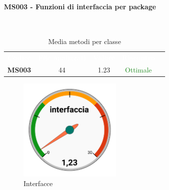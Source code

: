 \paragraph{MS003 - Funzioni di interfaccia per package}\mbox{}\\[0,3cm]
    \begin{table}[H]
        \centering
        \begin{tabular}{ccccc}
            \rowcolor{greySWEight}
            \textcolor{white}{\textbf{Codice}} &
            \textcolor{white}{\textbf{File analizzati}} &
            \textcolor{white}{\textbf{Valore}}&
            \textcolor{white}{\textbf{Riscontro}}\\
            \textbf{MS003} & 44 & 1.23 & \textcolor{ForestGreen}{Ottimale}\\
        \end{tabular}
        \caption{Media metodi per classe}
    \end{table}
    \begin{figure}[H]
        \centering
        \includegraphics[width=50mm]{sez/App_Esito/Qualifica/graph/interfacciaPerP.pdf}
        \caption{Interfacce}
    \end{figure}

